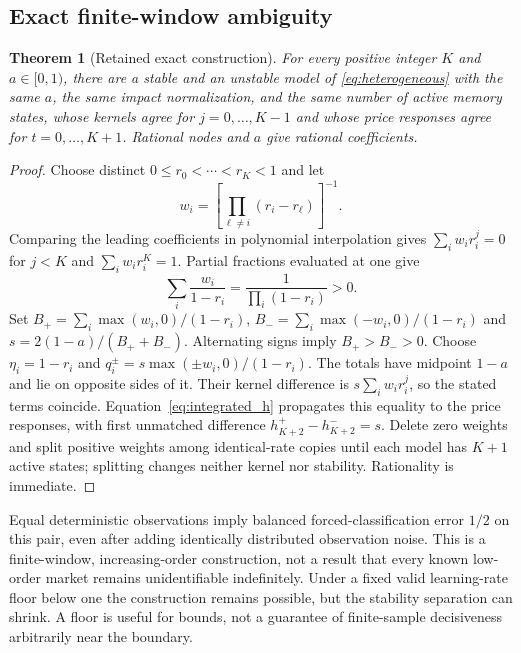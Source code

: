 \documentclass[11pt,a4paper]{article}
\newtheorem{theorem}{Theorem}[section]
\theoremstyle{definition}
\theoremstyle{remark}
\begin{document}
\subsection{Exact finite-window ambiguity}
\begin{theorem}[Retained exact construction]
\label{thm:retained_pair}
For every positive integer $K$ and $a\in[0,1)$, there are a stable and an unstable model of \eqref{eq:heterogeneous} with the same $a$, the same impact normalization, and the same number of active memory states, whose kernels agree for $j=0,\ldots,K-1$ and whose price responses agree for $t=0,\ldots,K+1$. Rational nodes and $a$ give rational coefficients.
\end{theorem}
\begin{proof}
Choose distinct $0\le r_0<\cdots<r_K<1$ and let
\[
 w_i=\left[\prod_{\ell\ne i}(r_i-r_\ell)\right]^{-1}.
\]
Comparing the leading coefficients in polynomial interpolation gives $\sum_iw_ir_i^j=0$ for $j<K$ and $\sum_iw_ir_i^K=1$. Partial fractions evaluated at one give
\[
 \sum_i\frac{w_i}{1-r_i}=\frac{1}{\prod_i(1-r_i)}>0.
\]
Set $B_+=\sum_i\max(w_i,0)/(1-r_i)$, $B_-=\sum_i\max(-w_i,0)/(1-r_i)$ and $s=2(1-a)/(B_++B_-)$. Alternating signs imply $B_+>B_->0$. Choose $\eta_i=1-r_i$ and $q_i^\pm=s\max(\pm w_i,0)/(1-r_i)$. The totals have midpoint $1-a$ and lie on opposite sides of it. Their kernel difference is $s\sum_iw_ir_i^j$, so the stated terms coincide. Equation~\eqref{eq:integrated_h} propagates this equality to the price responses, with first unmatched difference $h^+_{K+2}-h^-_{K+2}=s$. Delete zero weights and split positive weights among identical-rate copies until each model has $K+1$ active states; splitting changes neither kernel nor stability. Rationality is immediate.
\end{proof}

Equal deterministic observations imply balanced forced-classification error $1/2$ on this pair, even after adding identically distributed observation noise. This is a finite-window, increasing-order construction, not a result that every known low-order market remains unidentifiable indefinitely. Under a fixed valid learning-rate floor below one the construction remains possible, but the stability separation can shrink. A floor is useful for bounds, not a guarantee of finite-sample decisiveness arbitrarily near the boundary.
\end{document}
